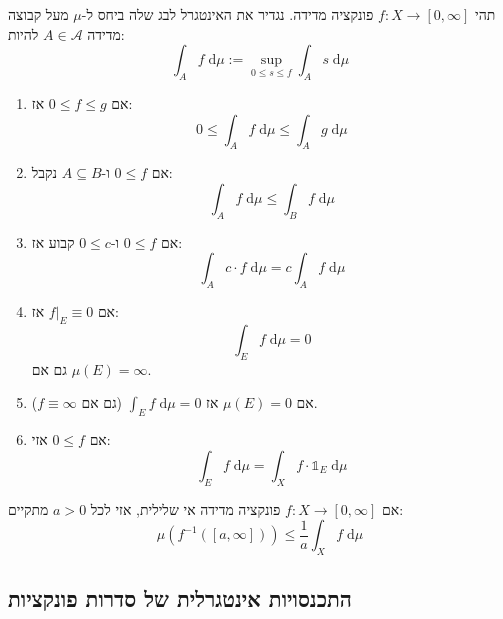 \documentclass{tstextbook}
\begin{document}
\begin{definition}
תהי \(f:X\to \left[ 0,\infty \right]\) פונקציה מדידה. נגדיר את האינטגרל לבג שלה ביחס ל-\(\mu\) מעל קבוצה מדידה \(A \in \mathcal{ A}\) להיות:
$$\int _{A}f \;\mathrm{d} \mu := \sup _{0\leq s \leq f} \int _{A}s \;\mathrm{d} \mu $$

\end{definition}
\begin{proposition}
  \begin{enumerate}
    \item אם \(0\leq f\leq g\) אז: 
$$0\leq \int _{A}f \;\mathrm{d} \mu \leq \int _{A}g \;\mathrm{d} \mu $$


    \item אם \(0\leq f\) ו-\(A\subseteq B\) נקבל: 
$$\int _{A}f \;\mathrm{d} \mu \leq \int _{B} f\;\mathrm{d} \mu  $$


    \item אם \(0\leq f\) ו-\(0\leq c\) קבוע אז: 
$$\int _{A} c\cdot f  \;\mathrm{d} \mu= c \int _{A}f \;\mathrm{d} \mu  $$


    \item אם \(f|_{E}\equiv 0\) אז: 
$$\int _{E}f \;\mathrm{d} \mu=0 $$
גם אם \(\mu(E)=\infty\).


    \item אם \(\mu(E)=0\) אז \(\int _{E}f \;\mathrm{d} \mu=0\) (גם אם \(f  \equiv \infty\)). 


    \item אם \(0\leq f\) אזי: 
$$\int _{E}f \;\mathrm{d} \mu=\int _{X}f \cdot \mathbb{1} _{E} \;\mathrm{d} \mu  $$


  \end{enumerate}
\end{proposition}
\begin{proposition}
אם \(f:X\to \left[ 0,\infty \right]\) פונקציה מדידה אי שלילית, אזי לכל \(a> 0\) מתקיים:
$$\mu\left( f^{-1}\left( \left[ a,\infty \right] \right) \right)\leq \frac{1}{a}\int _{X}f\;\mathrm{d} \mu $$

\end{proposition}
\subsection{התכנסויות אינטגרלית של סדרות פונקציות}
\end{document}
